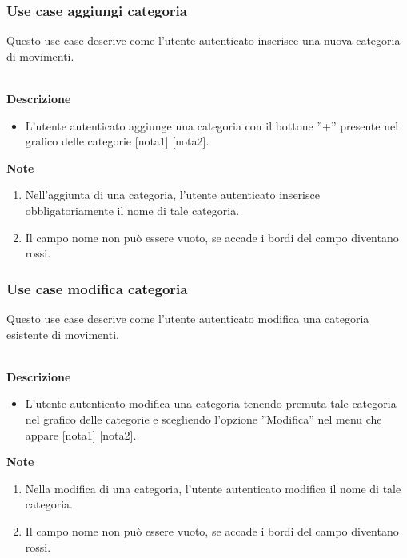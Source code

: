 \documentclass[a4paper,12pt]{article}
\begin{document}
\subsubsection*{Use case aggiungi categoria}

Questo use case descrive come l'utente autenticato inserisce una nuova categoria di movimenti.

\textbf{\\Descrizione}
\begin{itemize} \setlength\itemsep{0.01em}
\item L'utente autenticato aggiunge una categoria con il bottone ''+'' presente nel grafico delle categorie [nota1] [nota2].
\end{itemize}

\textbf{Note}
\begin{enumerate} \setlength\itemsep{0.01em}
\item Nell'aggiunta di una categoria, l'utente autenticato inserisce obbligatoriamente il nome di tale categoria.
\item Il campo nome non può essere vuoto, se accade i bordi del campo diventano rossi.
\end{enumerate}




\subsubsection*{Use case modifica categoria}

Questo use case descrive come l'utente autenticato modifica una categoria esistente di movimenti.

\textbf{\\Descrizione}
\begin{itemize} \setlength\itemsep{0.01em}
\item L'utente autenticato modifica una categoria tenendo premuta tale categoria nel grafico delle categorie e scegliendo l'opzione ''Modifica'' nel menu che appare [nota1] [nota2].
\end{itemize}

\textbf{Note}
\begin{enumerate} \setlength\itemsep{0.01em}
\item Nella modifica di una categoria, l'utente autenticato modifica il nome di tale categoria.
\item Il campo nome non può essere vuoto, se accade i bordi del campo diventano rossi.
\end{enumerate}
\end{document}
